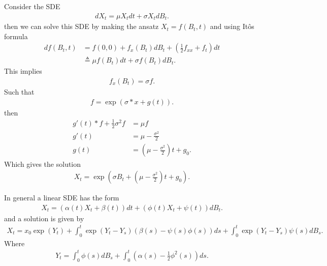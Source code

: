 \begin{example}[5.1]
 Consider the SDE 
 \begin{align*}
  dX_t = \mu X_t dt + \sigma X_t dB_t
 .\end{align*}
 then we can solve this SDE by making the ansatz $X_t = f(B_t,t)$ and using It\^os formula
 \begin{align*}
   df(B_t,t) &= f(0,0) + f_x(B_t)dB_t + (\frac{1}{2}f_{x x}+f_{t}) dt\\
           &\triangleq  \mu  f(B_t) dt + \sigma f(B_t)dB_t
 .\end{align*}
 This implies 
 \begin{align*}
  f_x(B_t) = \sigma  f
 .\end{align*}
 Such that 
 \begin{align*}
  f = \exp(\sigma*x + g(t))
 .\end{align*}
 then 
 \begin{align*}
   g'(t)*f + \frac{1}{2} \sigma^2 f &= \mu  f\\
                                g'(t)   &= \mu  - \frac{\sigma^2}{2}\\
                                g(t)&= (\mu  - \frac{\sigma^2}{2})t + g_{0}
 .\end{align*}
 Which gives the solution 
 \begin{align*}
  X_t = \exp(\sigma B_t + (\mu -\frac{\sigma^2}{2})t + g_{0})
 .\end{align*}
\end{example}
\begin{Definition}
 In general a linear SDE has the form
 \begin{align*}
  X_t = (\alpha (t)X_t + \beta(t) )dt + (\phi(t)X_t + \psi(t))dB_t
 .\end{align*}
 and a solution is given by 
 \begin{align*}
  X_t  = x_{0}\exp(Y_t) + \int_0^{t} \exp(Y_t-Y_s)(\beta(s)-\psi(s)\phi(s))  ds + \int_0^{t}  \exp(Y_t-Y_s)\psi(s)dB_s
 .\end{align*}
 Where
 \begin{align*}
  Y_t = \int_0^{t} \phi(s) dB_s + \int_0^{t}(\alpha(s)-\frac{1}{2}\phi^2(s))   ds
 .\end{align*}
\end{Definition}
